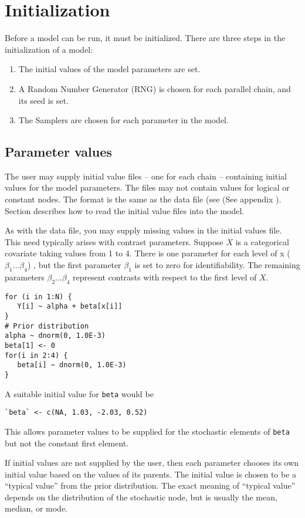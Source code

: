 \documentclass[11pt, a4paper, titlepage]{report}
\begin{document}
\section{Initialization}

Before a model can be run, it must be initialized. There are three
steps in the initialization of a model:
\begin{enumerate}
\item The initial values of the model parameters are set.
\item A Random Number Generator (RNG) is chosen for each parallel chain,
  and its seed is set.
\item The Samplers are chosen for each parameter in the model. 
\end{enumerate}

\subsection{Parameter values}

The user may supply initial value files -- one for each chain --
containing initial values for the model parameters. The files may not
contain values for logical or constant nodes. The format is the same
as the data file (see (See appendix \cite{appendix:data}).
Section \cite{parameters:in} describes how to read the initial value
files into the model.

As with the data file, you may supply missing values in the initial
values file.  This need typically arises with contrast parameters.
Suppose $X$ is a categorical covariate taking values from 1 to
4. There is one parameter for each level of x ($\beta_1 \ldots
\beta_4$) , but the first parameter $\beta_1$ is set to zero for
identifiability. The remaining parameters $\beta_2 \ldots \beta_4$
represent contrasts with respect to the first level of $X$.
\begin{verbatim}
for (i in 1:N) {
   Y[i] ~ alpha + beta[x[i]]
}
# Prior distribution
alpha ~ dnorm(0, 1.0E-3)
beta[1] <- 0
for(i in 2:4) {
   beta[i] ~ dnorm(0, 1.0E-3)
}
\end{verbatim}
A suitable initial value for \verb+beta+ would be
\begin{verbatim}
`beta` <- c(NA, 1.03, -2.03, 0.52)
\end{verbatim}
This allows parameter values to be supplied for the stochastic
elements of \verb+beta+ but not the constant first element.

If initial values are not supplied by the user, then each parameter
chooses its own initial value based on the values of its parents.  The
initial value is chosen to be a ``typical value'' from the prior
distribution. The exact meaning of ``typical value'' depends on the
distribution of the stochastic node, but is usually the mean, median,
or mode.
\end{document}
